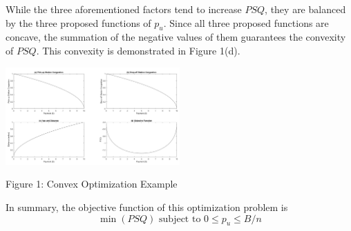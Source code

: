\documentclass[times, 10pt,twocolumn]{article}
\begin{document}
While the three aforementioned factors tend to increase $PSQ$, they are balanced by the three proposed functions of $p_u$. Since all three proposed functions are concave, the summation of the negative values of them guarantees the convexity of $PSQ$. This convexity is demonstrated in Figure 1(d).

\centerline{\includegraphics[width=0.5\textwidth]{m2/cvx_example.png}}
\centerline{Figure 1: Convex Optimization Example}
\hfill \break

\indent In summary, the objective function of this optimization problem is
\begin{equation}
\min(PSQ) \text{ subject to } 0 \leq p_u \leq B/n
\end{equation}

%
%
\end{document}
